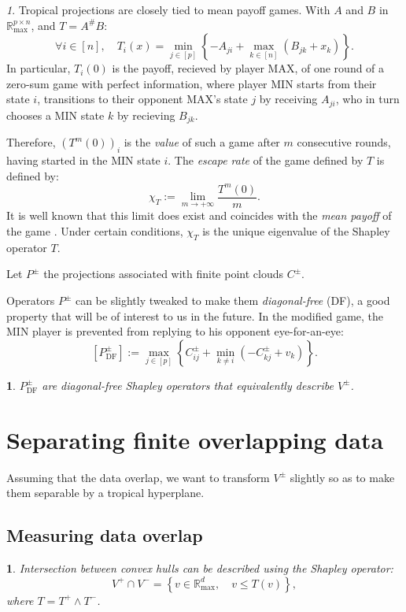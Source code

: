 \documentclass[oneside,english]{amsart}
\numberwithin{equation}{section}
\numberwithin{figure}{section}
\theoremstyle{plain}
\theoremstyle{definition}
\theoremstyle{plain}
\newtheorem{prop}[thm]{\protect\propositionname}
\theoremstyle{remark}
\newtheorem{rem}[thm]{\protect\remarkname}
\theoremstyle{plain}
\newtheorem{lem}[thm]{\protect\lemmaname}
\theoremstyle{definition}
\theoremstyle{definition}
\providecommand{\lemmaname}{Lemma}
\providecommand{\propositionname}{Proposition}
\providecommand{\remarkname}{Remark}
\begin{document}
\begin{rem}
Tropical projections are closely tied to mean payoff games. With $A$
and $B$ in $\mathbb{R}_{\max}^{p\times n}$, and $T=A^{\#}B$:
\[
\forall i\in[n],\quad T_{i}(x)=\min_{j\in[p]}\left\{ -A_{ji}+\max_{k\in[n]}(B_{jk}+x_{k})\right\} .
\]
In particular, $T_{i}(0)$ is the payoff, recieved by player MAX,
of one round of a zero-sum game with perfect information, where player
MIN starts from their state $i$, transitions to their opponent MAX's
state $j$ by receiving $A_{ji}$, who in turn chooses a MIN state
$k$ by recieving $B_{jk}$.

Therefore, $(T^{m}(0))_{i}$ is the \emph{value} of such a game after
$m$ consecutive rounds, having started in the MIN state $i$. The\emph{
escape rate }of the game defined by $T$ is defined by:
\[
\chi_{T}:=\lim_{m\rightarrow+\infty}\frac{T^{m}(0)}{m}.
\]
It is well known that this limit does exist and coincides with the \emph{mean payoff} of the game \cite{Allamigeon2018}. Under certain conditions, $\chi_{T}$ is the unique eigenvalue of the Shapley operator $T$.
\end{rem}

Let $P^\pm$ the projections associated with finite point clouds $C^\pm$. 

Operators $P^{\pm}$ can be slightly tweaked to make them \emph{diagonal-free}
(DF), a good property that will be of interest to us in the future.
In the modified game, the MIN player is prevented from replying to
his opponent eye-for-an-eye:
\[
\left[P_{\text{DF}}^{\pm}\right]:=\max_{j\in[p]}\left\{ C_{ij}^{\pm}+\min_{k\ne i}(-C_{kj}^{\pm}+v_{k})\right\}.
\]

\begin{prop}
$P^\pm_{\text{DF}}$ are diagonal-free Shapley operators that equivalently
describe $V^{\pm}$.
\end{prop}


\section{Separating finite overlapping data}

Assuming that the data overlap, we want to transform $V^{\pm}$ slightly
so as to make them separable by a tropical hyperplane.

\subsection{Measuring data overlap}
\begin{lem}
Intersection between convex hulls can be described using the Shapley operator:
\[
V^{+}\cap V^{-}=\left\{ v\in\mathbb{R}_{\max}^{d},\quad v\le T(v)\right\} ,
\]
where $T = T^+\wedge T^-$.
\end{lem}
\end{document}

